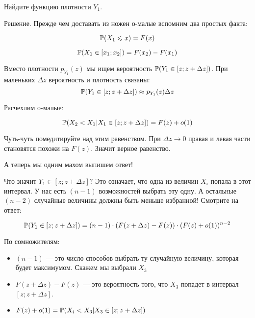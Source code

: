 \begin{myex} Найдите функцию плотности $ Y_{1} $.

Решение. Прежде чем доставать из ножен о-малые вспомним два простых факта:

\begin{equation}
\P(X_{1}\leq x)=F(x)
\end{equation}

\begin{equation}
\P(X_{1}\in [x_{1};x_{2}])=F(x_{2})-F(x_{1})
\end{equation}



Вместо плотности $ p_{Y_{1}}(z) $ мы ищем вероятность $ \P(Y_{1}\in [z;z+\Delta z]) $. При маленьких $ \Delta z $ вероятность и плотность связаны:
\begin{equation}
\P(Y_{1}\in [z;z+\Delta z])\approx p_{Y_{1}}(z)\Delta z
\end{equation}


Расчехлим о-малые:

\begin{equation}
\P(X_{2}<X_{1}|X_{1}\in [z;z+\Delta z])=F(z)+o(1)
\end{equation}

Чуть-чуть помедитируйте над этим равенством. При $ \Delta z\to 0 $ правая и левая части становятся похожи на $ F(z) $. Значит верное равенство.

А теперь мы одним махом выпишем ответ!

Что значит $ Y_{1}\in [z;z+\Delta z] $? Это означает, что одна из величин $ X_{i} $ попала в этот интервал. У нас есть $ (n-1) $ возможностей выбрать эту одну. А остальные $ (n-2) $ случайные величины должны быть меньше избранной! Смотрите на ответ:

\begin{equation}
\P(Y_{1}\in [z;z+\Delta z])=(n-1)\cdot (F(z+\Delta z)-F(z)) \cdot (F(z)+o(1))^{n-2}
\end{equation}

По сомножителям:
\begin{itemize}
\item $ (n-1) $ — это число способов выбрать ту случайную величину, которая будет максимумом. Скажем мы выбрали $ X_{3} $
\item $ F(z+\Delta z)-F(z) $ — это вероятность того, что $ X_{3} $ попадет в интервал $ [z;z+\Delta z] $.
\item $ F(z)+o(1)=\P(X_{i}<X_{3}|X_{3}\in [z;z+\Delta z]) $
\end{itemize}


\end{myex}
